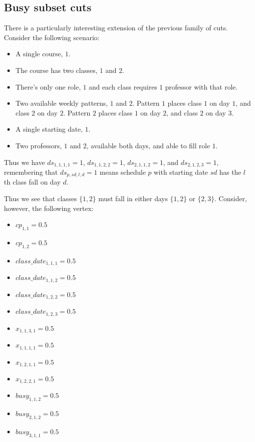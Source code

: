 \subsection{Busy subset cuts}
There is a particularly interesting extension of the previous family of cuts. Consider the following scenario:
\begin{itemize}
\item A single course, $1$.
\item The course has two classes, $1$ and $2$.
\item There's only one role, $1$ and each class requires $1$ professor with that role.
\item Two available weekly patterns, $1$ and $2$. Pattern $1$ places class $1$ on day $1$, and class $2$ on day $2$. Pattern $2$ places class $1$ on day $2$, and class $2$ on day $3$.
\item A single starting date, $1$.
\item Two professors, $1$ and $2$, available both days, and able to fill role $1$.
\end{itemize}

Thus we have $ds_{1, 1, 1, 1} = 1$, $ds_{1, 1, 2, 2} = 1$, $ds_{2, 1, 1, 2} = 1$, and $ds_{2, 1, 2, 3} = 1$, remembering that $ds_{p, sd, l, d} = 1$ means schedule $p$ with starting date $sd$ has the $l$th class fall on day $d$.

Thus we see that classes $\{1, 2\}$ must fall in either days $\{1, 2\}$ or $\{2, 3\}$. Consider, however, the following vertex:

\begin{itemize}
\item $cp_{1, 1} = 0.5$
\item $cp_{1, 2} = 0.5$
\item $class\_date_{1, 1, 1} = 0.5$
\item $class\_date_{1, 1, 2} = 0.5$
\item $class\_date_{1, 2, 2} = 0.5$
\item $class\_date_{1, 2, 3} = 0.5$
\item $x_{1, 1, 3, 1} = 0.5$
\item $x_{1, 1, 1, 1} = 0.5$
\item $x_{1, 2, 1, 1} = 0.5$
\item $x_{1, 2, 2, 1} = 0.5$
\item $busy_{1, 1, 2} = 0.5$
\item $busy_{2, 1, 2} = 0.5$
\item $busy_{3, 1, 1} = 0.5$
\end{itemize}

